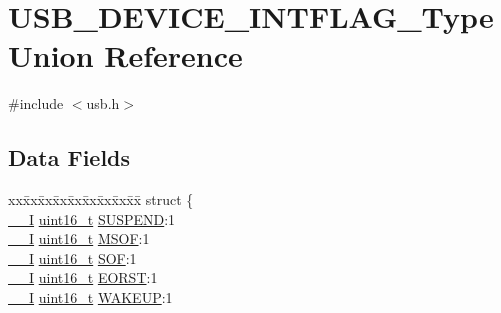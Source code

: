 \hypertarget{union_u_s_b___d_e_v_i_c_e___i_n_t_f_l_a_g___type}{}\section{U\+S\+B\+\_\+\+D\+E\+V\+I\+C\+E\+\_\+\+I\+N\+T\+F\+L\+A\+G\+\_\+\+Type Union Reference}
\label{union_u_s_b___d_e_v_i_c_e___i_n_t_f_l_a_g___type}


{\ttfamily \#include $<$usb.\+h$>$}

\subsection*{Data Fields}
\begin{DoxyCompactItemize}
\item 
\begin{tabbing}
xx\=xx\=xx\=xx\=xx\=xx\=xx\=xx\=xx\=\kill
struct \{\\
\>\mbox{\hyperlink{core__cm0plus_8h_af63697ed9952cc71e1225efe205f6cd3}{\_\_I}} \mbox{\hyperlink{union_u_s_b___d_e_v_i_c_e___i_n_t_f_l_a_g___type_a25e8fd3335b0c4872c6e2910bd01f0f6}{uint16\_t}} \mbox{\hyperlink{union_u_s_b___d_e_v_i_c_e___i_n_t_f_l_a_g___type_aee6a46e73644e11e8ccad8075c1785f1}{SUSPEND}}:1\\
\>\mbox{\hyperlink{core__cm0plus_8h_af63697ed9952cc71e1225efe205f6cd3}{\_\_I}} \mbox{\hyperlink{union_u_s_b___d_e_v_i_c_e___i_n_t_f_l_a_g___type_a25e8fd3335b0c4872c6e2910bd01f0f6}{uint16\_t}} \mbox{\hyperlink{union_u_s_b___d_e_v_i_c_e___i_n_t_f_l_a_g___type_a45a83335e0a09100aafcebaceba06291}{MSOF}}:1\\
\>\mbox{\hyperlink{core__cm0plus_8h_af63697ed9952cc71e1225efe205f6cd3}{\_\_I}} \mbox{\hyperlink{union_u_s_b___d_e_v_i_c_e___i_n_t_f_l_a_g___type_a25e8fd3335b0c4872c6e2910bd01f0f6}{uint16\_t}} \mbox{\hyperlink{union_u_s_b___d_e_v_i_c_e___i_n_t_f_l_a_g___type_a2cf5fd7fea16e8b82ef3661dd143cc51}{SOF}}:1\\
\>\mbox{\hyperlink{core__cm0plus_8h_af63697ed9952cc71e1225efe205f6cd3}{\_\_I}} \mbox{\hyperlink{union_u_s_b___d_e_v_i_c_e___i_n_t_f_l_a_g___type_a25e8fd3335b0c4872c6e2910bd01f0f6}{uint16\_t}} \mbox{\hyperlink{union_u_s_b___d_e_v_i_c_e___i_n_t_f_l_a_g___type_a810d6179d430f087fd21ca09e3c863d6}{EORST}}:1\\
\>\mbox{\hyperlink{core__cm0plus_8h_af63697ed9952cc71e1225efe205f6cd3}{\_\_I}} \mbox{\hyperlink{union_u_s_b___d_e_v_i_c_e___i_n_t_f_l_a_g___type_a25e8fd3335b0c4872c6e2910bd01f0f6}{uint16\_t}} \mbox{\hyperlink{union_u_s_b___d_e_v_i_c_e___i_n_t_f_l_a_g___type_a84bb3fe0a50a407a76cf6111eee40622}{WAKEUP}}:1\\

\end{tabbing}
\end{DoxyCompactItemize}

